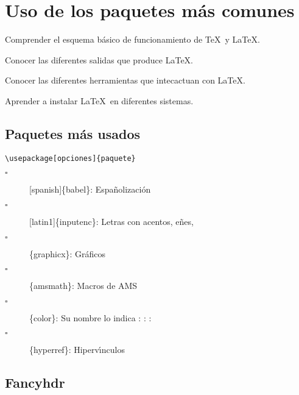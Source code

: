 \chapter{Uso de los paquetes m\'as comunes}
\chaptertoc
\begin{objetivos}
\begin{lista}
\item Comprender el esquema básico de funcionamiento de \TeX\, y \LaTeX .
\item Conocer las diferentes salidas que produce \LaTeX.
\item Conocer las diferentes herramientas que intecactuan con \LaTeX.
\item Aprender a instalar \LaTeX\, en diferentes sistemas.
\end{lista}
\end{objetivos} 
\section{Paquetes m\'{a}s usados}
\begin{verbatim}
\usepackage[opciones]{paquete}
\end{verbatim}

\begin{description}
\item[$\square$] [spanish]\{babel\}: Espa\~{n}olizaci\'{o}n

\item[$\square$] [latin1]\{inputenc\}: Letras con acentos, e\~{n}es,

\item[$\square$] \{graphicx\}: Gr\'{a}ficos

\item[$\square$] \{amsmath\}: Macros de AMS

\item[$\square$] \{color\}: Su nombre lo indica : : :

\item[$\square$] \{hyperref\}: Hiperv\'{\i}nculos
\end{description}
\section{Fancyhdr}
\pagestyle{headings}
